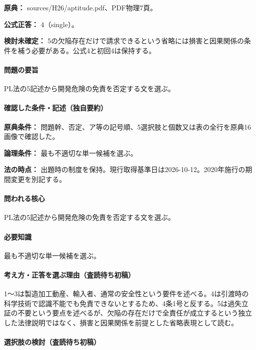 \noindent\textbf{原典：} sources/H26/aptitude.pdf、PDF物理7頁。

\textbf{公式正答：} 4（single）。

\par\textbf{検討未確定：} 5の欠陥存在だけで請求できるという省略には損害と因果関係の条件を補う必要がある。公式4と初回4は保持する。

\paragraph{問題の要旨} PL法の5記述から開発危険の免責を否定する文を選ぶ。

\paragraph{確認した条件・記述（独自要約）}\mbox{}\par

\noindent\textbf{原典条件：} 問題幹、否定、ア等の記号順、5選択肢と個数又は表の全行を原典16画像で確認した。\par

\noindent\textbf{論理条件：} 最も不適切な単一候補を選ぶ。\par

\noindent\textbf{法の時点：} 出題時の制度を保持。現行取得基準日は2026-10-12。2020年施行の期間変更を別記する。\par

\paragraph{問われる核心} PL法の5記述から開発危険の免責を否定する文を選ぶ。

\paragraph{必要知識} 最も不適切な単一候補を選ぶ。

\paragraph{考え方・正答を選ぶ理由（査読待ち初稿）} 1〜3は製造加工動産、輸入者、通常の安全性という要件を述べる。4は引渡時の科学技術で認識不能でも免責できないとするため、4条1号と反する。5は過失立証の不要という要点を述べるが、欠陥の存在だけで全責任が成立するという独立した法律説明ではなく、損害と因果関係を前提とした省略表現として読む。

\paragraph{選択肢の検討（査読待ち初稿）}\mbox{}\par

